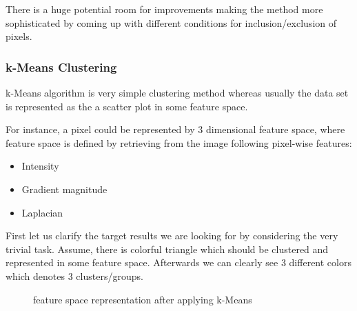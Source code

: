 There is a huge potential room for improvements making the method more sophisticated by coming up with different conditions for inclusion/exclusion of pixels.

\subsubsection{k-Means Clustering}
k-Means algorithm is very simple clustering method whereas usually the data set is represented as the a scatter plot in some feature space.

For instance, a pixel could be represented by 3 dimensional feature space, where feature space is defined by retrieving from the image following pixel-wise features:
\begin{itemize}
    \item Intensity
    \item Gradient magnitude
    \item Laplacian
\end{itemize}

First let us clarify the target results we are looking for by considering the very trivial task.
Assume, there is colorful triangle which should be clustered and represented in some feature space. Afterwards we can clearly see 3 different colors which denotes 3 clusters/groups.
\begin{figure}[h]
    \centering
    \qquad
    \caption{feature space representation after applying k-Means}%
    \label{fig:grwoing_region}%
\end{figure}

